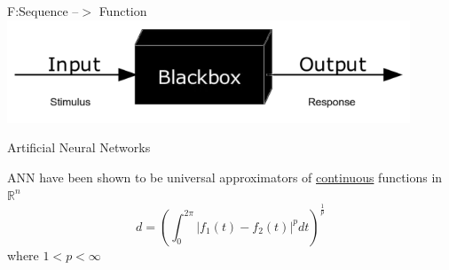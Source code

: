 \documentclass{beamer}
\begin{document}
\begin{frame}{F:Sequence --$>$ Function}
\includegraphics[width=0.90\textwidth]{blackbox}
\end{frame}

\begin{frame}{Artificial Neural Networks}
\begin{minipage}[t]{0.5\textwidth}
  \centering{}
\end{minipage}\hfill
\begin{minipage}[t]{0.5\textwidth}
ANN have been shown to be universal approximators of \underline{continuous} functions in $\mathbb{R}^n$ \\
$$
d=\left(\int_0^{2\pi}|f_1(t)-f_2(t)|^p dt\right)^\frac{1}{p}
$$
where $1<p<\infty$
\end{minipage}
\end{frame}
\end{document}
